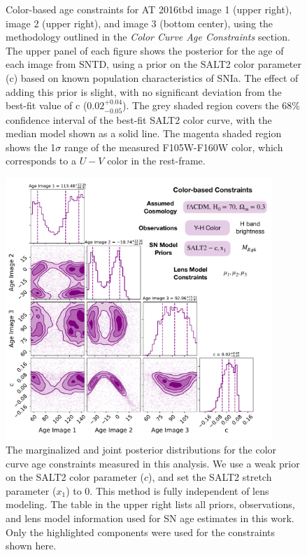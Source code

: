 \documentclass[12pt]{article}
\def\SNABC{AT 2016tbd\xspace}
\begin{document}
\begin{figure}
    \caption{Color-based age constraints for \SNABC image 1 (upper right), image 2 (upper right), and image 3 (bottom center), using the methodology outlined in the \textit{Color Curve Age Constraints} section. The upper panel of each figure shows the posterior for the age of each image from SNTD, using a prior on the SALT2 color parameter (c) based on known population characteristics of SNIa. The effect of adding this prior is slight, with no significant deviation from the best-fit value of c ($0.02^{+0.04}_{-0.05}$). The grey shaded region covers the 68\% confidence interval of the best-fit SALT2 color curve, with the median model shown as a solid line. The magenta shaded region shows the 1$\sigma$ range of the measured F105W-F160W color, which corresponds to a $U-V$ color in the rest-frame.}
    \label{fig:colorcurves}
\end{figure}



\begin{figure}
    \centering
    \includegraphics[width=0.9\textwidth]{Paper/Figures/corner_color_curve_fit_with_c_prior_labels.pdf}
    \caption{The marginalized and joint posterior distributions for the color curve age constraints measured in this analysis. We use a weak prior on the SALT2 color parameter ($c$), and set the SALT2 stretch parameter ($x_1$) to 0. This method is fully independent of lens modeling.  The table in the upper right lists all 
    priors, observations, and lens model information
    used for SN age estimates in this work.  
    Only the highlighted 
    components were used for the constraints shown here.}
    \label{fig:corner_cfit}
\end{figure}
\end{document}
